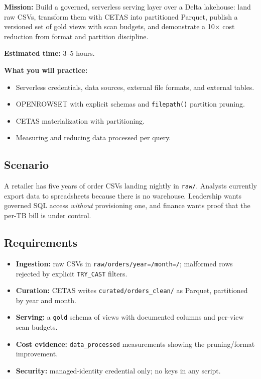 \begin{capstonebox}
\textbf{Mission:} Build a governed, serverless serving layer over a Delta lakehouse: land raw CSVs, transform them with CETAS into partitioned Parquet, publish a versioned set of gold views with scan budgets, and demonstrate a 10$\times$ cost reduction from format and partition discipline.

\textbf{Estimated time:} 3--5 hours.

\textbf{What you will practice:}
\begin{itemize}
    \item Serverless credentials, data sources, external file formats, and external tables.
    \item OPENROWSET with explicit schemas and \texttt{filepath()} partition pruning.
    \item CETAS materialization with partitioning.
    \item Measuring and reducing data processed per query.
\end{itemize}
\end{capstonebox}

\subsection*{Scenario}
A retailer has five years of order CSVs landing nightly in \texttt{raw/}. Analysts currently export data to spreadsheets because there is no warehouse. Leadership wants governed SQL access \emph{without} provisioning one, and finance wants proof that the per-TB bill is under control.

\subsection*{Requirements}
\begin{itemize}
    \item \textbf{Ingestion:} raw CSVs in \texttt{raw/orders/year=/month=/}; malformed rows rejected by explicit \texttt{TRY\_CAST} filters.
    \item \textbf{Curation:} CETAS writes \texttt{curated/orders\_clean/} as Parquet, partitioned by year and month.
    \item \textbf{Serving:} a \texttt{gold} schema of views with documented columns and per-view scan budgets.
    \item \textbf{Cost evidence:} \texttt{data\_processed} measurements showing the pruning/format improvement.
    \item \textbf{Security:} managed-identity credential only; no keys in any script.
\end{itemize}

